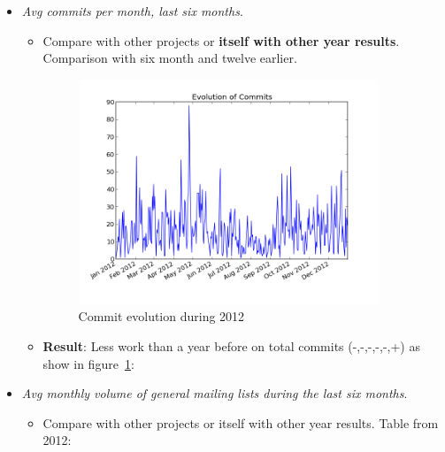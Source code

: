 \documentclass[11pt]{scrartcl}
\begin{document}
\begin{itemize}
    \item \emph{Avg commits per month, last six months}.
        \begin{itemize}
            \item Compare with other projects or \textbf{itself with other year results}. Comparison with six month and twelve earlier.
            \begin{figure}[H]
            \begin{center}
              \includegraphics[width=0.9\textwidth]{libcsvanaly2/script_sample/basic_timeseries.png}
              \caption{Commit evolution during 2012}
              \label{fig:2012-monthy-commmits}
            \end{center}
            \end{figure}

            \item \textbf{Result}: Less work than a year before on total commits (-,-,-,-,-,+) as show in figure~\ref{fig:2012-monthy-commmits}:
        \end{itemize}
    \item \emph{Avg monthly volume of general mailing lists during the last six months}.
    \begin{itemize}
        \item Compare with other projects or itself with other year results. Table from 2012:


\end{itemize}
\end{itemize}
\end{document}
